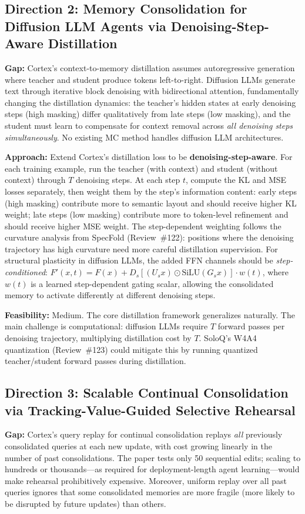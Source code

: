 \documentclass[11pt,a4paper]{article}
\begin{document}
\subsection{Direction 2: Memory Consolidation for Diffusion LLM Agents via Denoising-Step-Aware Distillation}
\textbf{Gap:} Cortex's context-to-memory distillation assumes autoregressive generation where teacher and student produce tokens left-to-right. Diffusion LLMs generate text through iterative block denoising with bidirectional attention, fundamentally changing the distillation dynamics: the teacher's hidden states at early denoising steps (high masking) differ qualitatively from late steps (low masking), and the student must learn to compensate for context removal across \emph{all denoising steps simultaneously}. No existing MC method handles diffusion LLM architectures.

\textbf{Approach:} Extend Cortex's distillation loss to be \textbf{denoising-step-aware}. For each training example, run the teacher (with context) and student (without context) through $T$ denoising steps. At each step $t$, compute the KL and MSE losses separately, then weight them by the step's information content: early steps (high masking) contribute more to semantic layout and should receive higher KL weight; late steps (low masking) contribute more to token-level refinement and should receive higher MSE weight. The step-dependent weighting follows the curvature analysis from SpecFold (Review~\#122): positions where the denoising trajectory has high curvature need more careful distillation supervision. For structural plasticity in diffusion LLMs, the added FFN channels should be \emph{step-conditioned}: $F'(x, t) = F(x) + D_s[(U_s x) \odot \text{SiLU}(G_s x)] \cdot w(t)$, where $w(t)$ is a learned step-dependent gating scalar, allowing the consolidated memory to activate differently at different denoising steps.

\textbf{Feasibility:} Medium. The core distillation framework generalizes naturally. The main challenge is computational: diffusion LLMs require $T$ forward passes per denoising trajectory, multiplying distillation cost by $T$. SoloQ's W4A4 quantization (Review~\#123) could mitigate this by running quantized teacher/student forward passes during distillation.

\subsection{Direction 3: Scalable Continual Consolidation via Tracking-Value-Guided Selective Rehearsal}
\textbf{Gap:} Cortex's query replay for continual consolidation replays \emph{all} previously consolidated queries at each new update, with cost growing linearly in the number of past consolidations. The paper tests only 50 sequential edits; scaling to hundreds or thousands---as required for deployment-length agent learning---would make rehearsal prohibitively expensive. Moreover, uniform replay over all past queries ignores that some consolidated memories are more fragile (more likely to be disrupted by future updates) than others.
\end{document}
